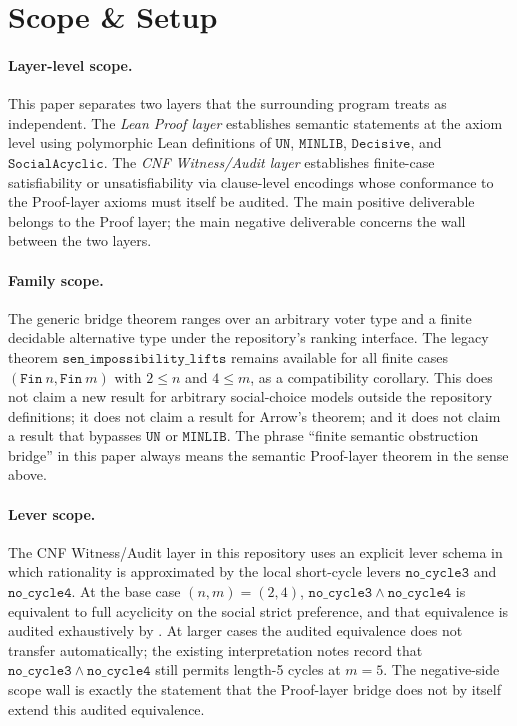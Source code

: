\section{Scope \& Setup}
\label{sec:scope}

\paragraph{Layer-level scope.}
This paper separates two layers that the surrounding program treats as independent.
The \emph{Lean Proof layer} establishes semantic statements at the axiom level using polymorphic Lean definitions of \(\mathtt{UN}\), \(\mathtt{MINLIB}\), \(\mathtt{Decisive}\), and \(\mathtt{SocialAcyclic}\).
The \emph{CNF Witness/Audit layer} establishes finite-case satisfiability or unsatisfiability via clause-level encodings whose conformance to the Proof-layer axioms must itself be audited.
The main positive deliverable belongs to the Proof layer; the main negative deliverable concerns the wall between the two layers.

\paragraph{Family scope.}
The generic bridge theorem ranges over an arbitrary voter type and a finite decidable alternative type under the repository's ranking interface.
The legacy theorem \(\mathtt{sen\_impossibility\_lifts}\) remains available for all finite cases \((\mathtt{Fin}\ n, \mathtt{Fin}\ m)\) with \(2 \leq n\) and \(4 \leq m\), as a compatibility corollary.
This does not claim a new result for arbitrary social-choice models outside the repository definitions; it does not claim a result for Arrow's theorem; and it does not claim a result that bypasses \(\mathtt{UN}\) or \(\mathtt{MINLIB}\).
The phrase ``finite semantic obstruction bridge'' in this paper always means the semantic Proof-layer theorem in the sense above.

\paragraph{Lever scope.}
The CNF Witness/Audit layer in this repository uses an explicit lever schema in which rationality is approximated by the local short-cycle levers \(\mathtt{no\_cycle3}\) and \(\mathtt{no\_cycle4}\).
At the base case \((n,m)=(2,4)\), \(\mathtt{no\_cycle3} \wedge \mathtt{no\_cycle4}\) is equivalent to full acyclicity on the social strict preference, and that equivalence is audited exhaustively by .
At larger cases the audited equivalence does not transfer automatically; the existing interpretation notes record that \(\mathtt{no\_cycle3} \wedge \mathtt{no\_cycle4}\) still permits length-5 cycles at \(m=5\).
The negative-side scope wall is exactly the statement that the Proof-layer bridge does not by itself extend this audited equivalence.

